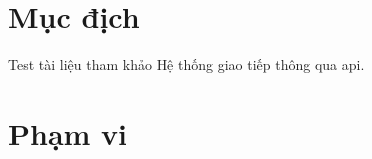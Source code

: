 
\section{Mục địch}
Test tài liệu tham khảo \cite{einstein}
Hệ thống giao tiếp thông qua \gls{api}.
\section{Phạm vi}